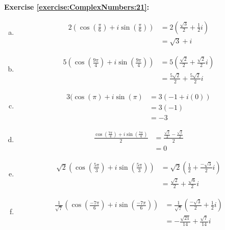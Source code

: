 \noindent\textbf{Exercise \ref{exercise:ComplexNumbers:21}:} %
\begin{enumerate}[(a)]
\item
\begin{align*}
2\left(\cos\left(\frac{\pi}{6}\right) + i\sin\left(\frac{\pi}{6}\right)\right) &= 2\left(\frac{\sqrt{3}}{2} + \frac{1}{2}i \right)\\
&= \sqrt{3} + i
\end{align*}

\item
\begin{align*}
5\left(\cos\left(\frac{9\pi}{4}\right) + i\sin\left(\frac{9\pi}{4}\right)\right) &= 5\left(\frac{\sqrt{2}}{2} + \frac{\sqrt{2}}{2}i\right)\\
&= \frac{5\sqrt{2}}{2} + \frac{5\sqrt{2}}{2}i
\end{align*}

\item
\begin{align*}
3(\cos(\pi) + i\sin(\pi) &= 3(-1 + i(0))\\
&= 3(-1)\\
&= -3
\end{align*}

\item
\begin{align*}
\frac{\cos\left(\frac{7\pi}{4}\right) + i\sin\left(\frac{7\pi}{4}\right)}{2} &= \frac{\frac{\sqrt{2}}{2} - \frac{\sqrt{2}}{2}}{2}\\
&=0
\end{align*}

\item
\begin{align*}
\sqrt{2}\left(\cos\left(\frac{5\pi}{3}\right) + i\sin\left(\frac{5\pi}{3}\right)\right) &= \sqrt{2}\left(\frac{1}{2} + \frac{-\sqrt{3}}{2}i\right)\\
&= \frac{\sqrt{2}}{2} + \frac{\sqrt{6}}{2}i
\end{align*}

\item
\begin{align*}
\frac{1}{\sqrt{7}}\left(\cos\left(\frac{-7\pi}{6}\right) + i\sin\left(\frac{-7\pi}{6}\right)\right) &= \frac{1}{\sqrt{7}}\left(\frac{-\sqrt{3}}{2} + \frac{1}{2}i\right)\\
&= -\frac{\sqrt{21}}{14} + \frac{\sqrt{7}}{14}i
\end{align*}


\end{enumerate}

